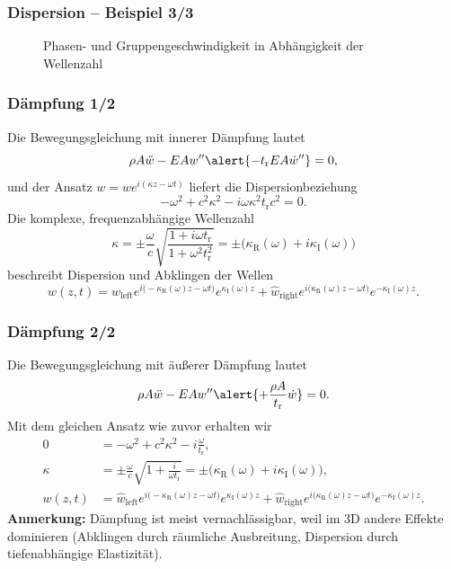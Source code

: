 \documentclass[hyperref={pdfpagemode=FullScreen, colorlinks=false}]{beamer}
\begin{document}
\begin{frame}
\frametitle{Dispersion -- Beispiel 3/3} 
\begin{figure}

\caption*{Phasen- und Gruppengeschwindigkeit in Abhängigkeit der Wellenzahl}
\end{figure}
\end{frame}

\begin{frame}
\frametitle{Dämpfung 1/2}
Die Bewegungsgleichung mit \alert{innerer Dämpfung} lautet
\begin{equation*}
\rho A \ddot{w} - EA w'' \alert{-t_\mathrm{r} EA \dot{w}''}=0,
\end{equation*}
und der Ansatz $w=\hat{w}e^{i(\kappa z-\omega t)}$ liefert die Dispersionbeziehung
\begin{equation*}
 -\omega^2+c^2\kappa^2-i\omega\kappa^2t_\mathrm{r}c^2=0.
\end{equation*}
Die komplexe, frequenzabhängige Wellenzahl
\begin{equation*}
\kappa=\pm \frac{\omega}{c}\sqrt{\frac{1+i\omega t_\mathrm{r}}{1+\omega^2t_\mathrm{r}^2}}=\pm\bigl(\kappa_\mathrm{R}(\omega)+i\kappa_\mathrm{I}(\omega)\bigr)
\end{equation*}
beschreibt Dispersion und Abklingen der Wellen
\begin{equation*}
 w(z,t)=\hat{w}_\mathrm{left}e^{i\bigl(-\kappa_\mathrm{R}(\omega) z-\omega t\bigr)}e^{\kappa_\mathrm{I}(\omega) z}
 +\hat{w}_\mathrm{right}e^{i\bigl(\kappa_\mathrm{R}(\omega) z-\omega t\bigr)}e^{-\kappa_\mathrm{I}(\omega) z} .
\end{equation*}
\end{frame}

\begin{frame}
\frametitle{Dämpfung 2/2}
Die Bewegungsgleichung mit \alert{äußerer Dämpfung} lautet
\begin{equation*}
\rho A \ddot{w} - EA w'' \alert{+ \frac{\rho A}{t_\mathrm{r}}\dot{w}}=0.
\end{equation*}
Mit dem gleichen Ansatz wie zuvor erhalten wir
\begin{align*}
 0 &= -\omega^2+c^2\kappa^2-i\frac{\omega}{t_\mathrm{r}} , \\
\kappa &= \pm \frac{\omega}{c}\sqrt{1+\frac{i}{\omega t_\mathrm{r}}}=\pm\bigl(\kappa_\mathrm{R}(\omega)+i\kappa_\mathrm{I}(\omega)\bigr) , \\
w(z,t)&=\hat{w}_\mathrm{left}e^{i\bigl(-\kappa_\mathrm{R}(\omega) z-\omega t\bigr)}e^{\kappa_\mathrm{I}(\omega) z}
 +\hat{w}_\mathrm{right}e^{i\bigl(\kappa_\mathrm{R}(\omega) z-\omega t\bigr)}e^{-\kappa_\mathrm{I}(\omega) z} .
\end{align*}
\textbf{Anmerkung:} Dämpfung ist meist vernachlässigbar, weil im 3D andere Effekte dominieren (Abklingen durch räumliche Ausbreitung, Dispersion durch tiefenabhängige Elastizität). 
\end{frame}
\end{document}

